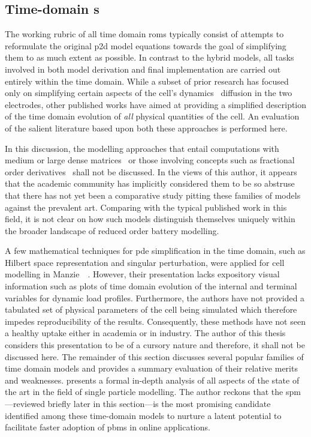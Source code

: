 \subsection{Time-domain  s}

The working rubric of all time  domain \glspl{rom} typically consist of attempts
to  reformulate the  original  \gls{p2d}  model equations  towards  the goal  of
simplifying  them to  as much  extent  as possible.  In contrast  to the  hybrid
models, all tasks involved in both model derivation and final implementation are
carried out  entirely within the time  domain. While a subset  of prior research
has  focused  only  on  simplifying  certain aspects  of  the  cell's  dynamics
\eg~diffusion  in  the two  electrodes,  other  published  works have  aimed  at
providing a  simplified description of  the time domain evolution  of \emph{all}
physical quantities of  the cell. An evaluation of the  salient literature based
upon both these approaches is performed here.


In  this discussion,  the  modelling approaches  that  entail computations  with
medium or large dense matrices~\cite{Li2016,Xu2016,Corno2015} or those involving
concepts such  as fractional  order derivatives~\cite{Sabatier2014,Sabatier2015,
Li2017, Mu2017, Wang2017}  shall not be discussed. In the  views of this author,
it appears that  the academic community has implicitly considered  them to be so
abstruse that there has not yet  been a comparative study pitting these families
of models against  the prevalent art. Comparing with the  typical published work
in  this field,  it  is not  clear  on how  such  models distinguish  themselves
uniquely within the broader landscape of reduced order battery modelling.


A few mathematical  techniques for \gls{pde} simplification in  the time domain,
such as Hilbert space representation and singular perturbation, were applied for
cell  modelling in  Manzie~\etal~\cite{Manzie2015}. However,  their presentation
lacks expository  visual information such as  plots of time domain  evolution of
the internal and terminal variables  for dynamic load profiles. Furthermore, the
authors  have  not provided  a  tabulated  set  of  physical parameters  of  the
cell being  simulated which  therefore impedes  reproducibility of  the results.
Consequently, these methods have not seen a healthy uptake either in academia or
in industry. The  author of this thesis  considers this presentation to  be of a
cursory nature  and therefore,  it shall  not be  discussed here.  The remainder
of  this  section discusses  several  popular  families  of time  domain  models
and  provides a  summary evaluation  of  their relative  merits and  weaknesses.
 presents a formal in-depth  analysis of all aspects of the
state of the art  in the field of single particle  modelling. The author reckons
that  the  \gls{spm}---reviewed briefly  later  in  this section---is  the  most
promising  candidate identified  among  these time-domain  models  to nurture  a
latent  potential  to  facilitate  faster  adoption  of  \glspl{pbm}  in  online
applications.

